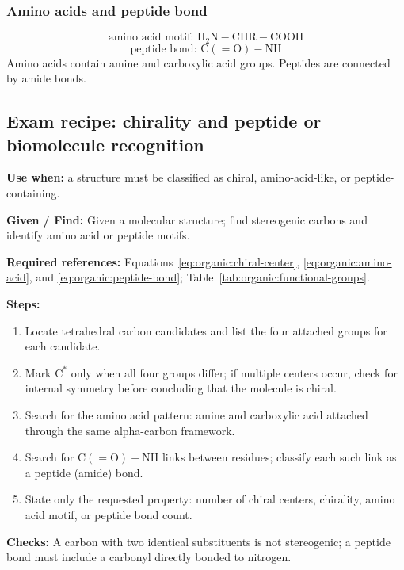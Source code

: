 \subsubsection{Amino acids and peptide bond}
\begin{equation}
\label{eq:organic:amino-acid}
\text{amino acid motif: }\mathrm{H_2N{-}CHR{-}COOH}
\end{equation}
\begin{equation}
\label{eq:organic:peptide-bond}
\text{peptide bond: }\mathrm{C(=O){-}NH}
\end{equation}
Amino acids contain amine and carboxylic acid groups. Peptides are connected by amide bonds.

\subsection{Exam recipe: chirality and peptide or biomolecule recognition}
\textbf{Use when:} a structure must be classified as chiral, amino-acid-like, or peptide-containing.

\textbf{Given / Find:} Given a molecular structure; find stereogenic carbons and identify amino acid or peptide motifs.

\textbf{Required references:} Equations~\eqref{eq:organic:chiral-center}, \eqref{eq:organic:amino-acid}, and \eqref{eq:organic:peptide-bond}; Table~\ref{tab:organic:functional-groups}.

\textbf{Steps:}
\begin{enumerate}
    \item Locate tetrahedral carbon candidates and list the four attached groups for each candidate.
    \item Mark \(\mathrm{C^*}\) only when all four groups differ; if multiple centers occur, check for internal symmetry before concluding that the molecule is chiral.
    \item Search for the amino acid pattern: amine and carboxylic acid attached through the same alpha-carbon framework.
    \item Search for \(\mathrm{C(=O){-}NH}\) links between residues; classify each such link as a peptide (amide) bond.
    \item State only the requested property: number of chiral centers, chirality, amino acid motif, or peptide bond count.
\end{enumerate}

\textbf{Checks:} A carbon with two identical substituents is not stereogenic; a peptide bond must include a carbonyl directly bonded to nitrogen.

